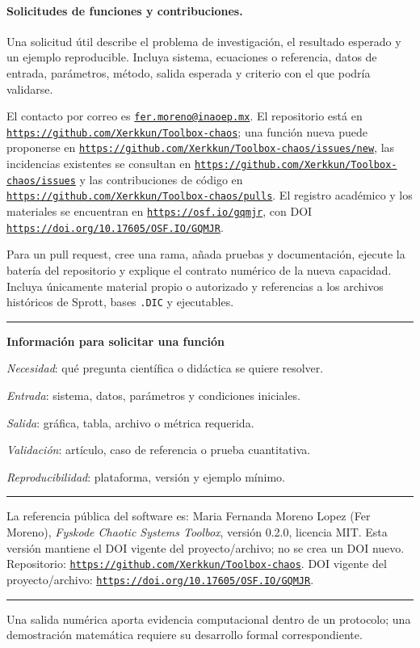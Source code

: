 \documentclass[11pt]{article}
\newcommand{\archivo}[1]{\nolinkurl{#1}}
\newcommand{\urlimpresa}[1]{\href{#1}{\nolinkurl{#1}}}
\newenvironment{cajaazul}[1]
{\begin{center}\begin{minipage}{0.93\linewidth}\color{GrisTexto}
\textcolor{AzulMedio}{\rule{\linewidth}{0.8pt}}\par\smallskip
\textcolor{AzulProfundo}{\bfseries #1}\par\smallskip}
{\par\smallskip\textcolor{AzulMedio}{\rule{\linewidth}{0.8pt}}\end{minipage}\end{center}}
\begin{document}
\paragraph{Solicitudes de funciones y contribuciones.}

Una solicitud útil describe el problema de investigación, el resultado esperado y un ejemplo reproducible. Incluya sistema, ecuaciones o referencia, datos de entrada, parámetros, método, salida esperada y criterio con el que podría validarse.

El contacto por correo es \href{mailto:fer.moreno@inaoep.mx}{\nolinkurl{fer.moreno@inaoep.mx}}. El repositorio está en \urlimpresa{https://github.com/Xerkkun/Toolbox-chaos}; una función nueva puede proponerse en \urlimpresa{https://github.com/Xerkkun/Toolbox-chaos/issues/new}, las incidencias existentes se consultan en \urlimpresa{https://github.com/Xerkkun/Toolbox-chaos/issues} y las contribuciones de código en \urlimpresa{https://github.com/Xerkkun/Toolbox-chaos/pulls}. El registro académico y los materiales se encuentran en \urlimpresa{https://osf.io/gqmjr}, con DOI \urlimpresa{https://doi.org/10.17605/OSF.IO/GQMJR}.

\begin{samepage}
Para un pull request, cree una rama, añada pruebas y documentación, ejecute la batería del repositorio y explique el contrato numérico de la nueva capacidad. Incluya únicamente material propio o autorizado y referencias a los archivos históricos de Sprott, bases \archivo{.DIC} y ejecutables.
\end{samepage}

\begin{cajaazul}{Información para solicitar una función}
\emph{Necesidad}: qué pregunta científica o didáctica se quiere resolver.\par
\emph{Entrada}: sistema, datos, parámetros y condiciones iniciales.\par
\emph{Salida}: gráfica, tabla, archivo o métrica requerida.\par
\emph{Validación}: artículo, caso de referencia o prueba cuantitativa.\par
\emph{Reproducibilidad}: plataforma, versión y ejemplo mínimo.
\end{cajaazul}

La referencia pública del software es: Maria Fernanda Moreno Lopez (Fer Moreno), \emph{Fyskode Chaotic Systems Toolbox}, versión 0.2.0, licencia MIT. Esta versión mantiene el DOI vigente del proyecto/archivo; no se crea un DOI nuevo. Repositorio: \urlimpresa{https://github.com/Xerkkun/Toolbox-chaos}. DOI vigente del proyecto/archivo: \urlimpresa{https://doi.org/10.17605/OSF.IO/GQMJR}.

\vfill
\begin{center}
\color{AzulProfundo}\rule{0.78\linewidth}{0.5pt}\par
\small Una salida numérica aporta evidencia computacional dentro de un protocolo; una demostración matemática requiere su desarrollo formal correspondiente.
\end{center}
\end{document}
